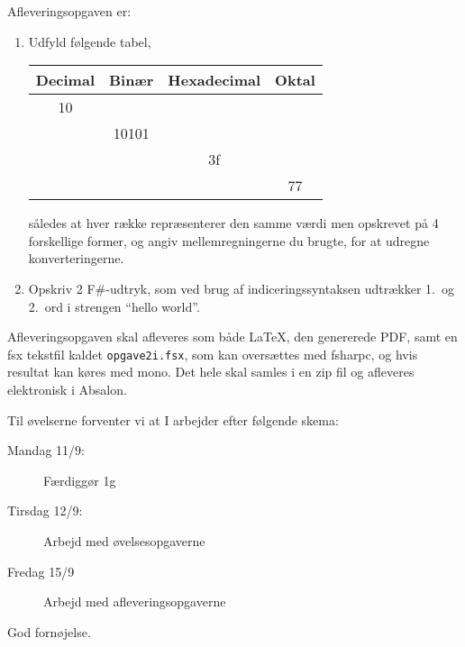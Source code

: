 \documentclass[a4paper,12pt]{article}
\begin{document}
Afleveringsopgaven er:
\begin{enumerate}[label=2i.\arabic*,start=0]
\item Udfyld følgende tabel,
  \begin{center}
    \begin{tabular}{|c|c|c|c|}
      \hline
      Decimal & Binær & Hexadecimal & Oktal\\
      \hline
              10 &  &  & \\
      \hline
              & 10101 &  & \\
      \hline
               &  & 3f  & \\
      \hline
              &  &  & 77 \\
      \hline
    \end{tabular}
  \end{center}
således at hver række repræsenterer den samme værdi men opskrevet på 4 forskellige former, og angiv mellemregningerne du brugte, for at udregne konverteringerne.
\item Opskriv 2 F\#-udtryk, som ved brug af indiceringssyntaksen udtrækker 1.\ og 2.\ ord i strengen ``hello world''.
\end{enumerate}
Afleveringsopgaven skal afleveres som både LaTeX, den genererede PDF,
samt en fsx tekstfil kaldet \verb|opgave2i.fsx|, som kan oversættes med fsharpc, og hvis resultat kan køres med mono. Det hele skal samles i en zip fil og afleveres elektronisk i Absalon.

Til øvelserne forventer vi at I arbejder efter følgende skema:
\begin{description}
\item[Mandag 11/9:] Færdiggør 1g
\item[Tirsdag 12/9:] Arbejd med øvelsesopgaverne
\item[Fredag 15/9]  Arbejd med afleveringsopgaverne
\end{description}


\flushright God fornøjelse.
\end{document}
